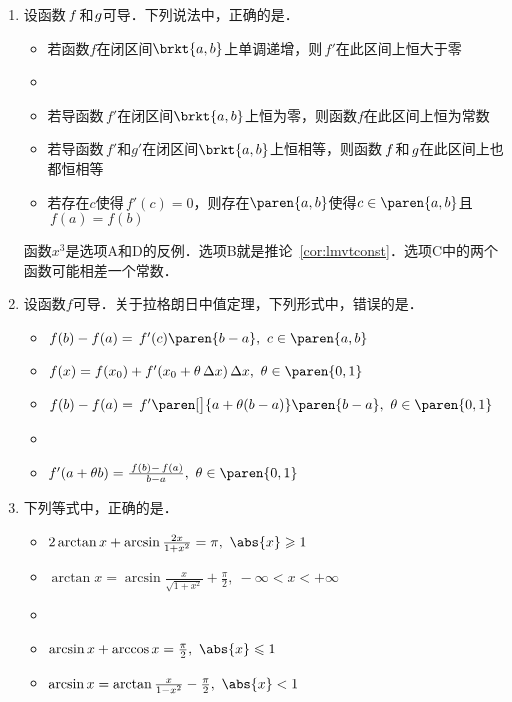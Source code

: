 \begin{enumerate}
\item 设函数\(\,f\mkern2mu\)和\(\mkern1mu g\)可导．下列说法中，正确的是\uline{\hspace{10em}}．
  \begin{itemize}
    \renewcommand{\labelitemi}{\faCircleThin}
  \item 若函数\(f\)在闭区间\(\brkt{a,b}\)上单调递增，则\(\,f'\!\)在此区间上恒大于零
    \ifshowsol
  \item[\faCircle]
    \else
  \item
    \fi
    若导函数\(\,f'\!\)在闭区间\(\brkt{a,b}\)上恒为零，则函数\(f\)在此区间上恒为常数
  \item 若导函数\(\,f'\!\)和\(g'\!\)在闭区间\(\brkt{a,b}\)上恒相等，则函数\(\,f\mkern2mu\)和\(\mkern2mu g\)在此区间上也都恒相等
  \item 若存在\(c\)使得\(\,f'(c) = 0\)，则存在\(\paren{a,b}\)使得\(c \in \paren{a,b}\)且\(\,f(a) = f(b)\)
  \end{itemize}

  \ifshowsol
  函数\(x^3\)是选项A和D的反例．选项B就是推论~\ref{cor:lmvtconst}．选项C中的两个函数可能相差一个常数．
  \fi

\item 设函数\(f\)可导．关于拉格朗日中值定理，下列形式中，错误的是\uline{\hspace{10em}}．
  \begin{itemize}
    \renewcommand{\labelitemi}{\faCircleThin}
  \item \(f(b) - f(a) = \,f'(c) \paren{b-a},\ c \in \paren{a,b}\)
  \item \(f(x) = f(x_0) + f'(x_0 + \theta\fdx) \fdx,\ \theta \in \paren{0,1}\)
  \item \(f(b) - f(a) = \,f'\paren[\big]{a + \theta(b-a)} \paren{b-a},\ \theta \in \paren{0,1}\)
    \ifshowsol
  \item[\faCircle]
    \else
  \item
    \fi
    \(f'(a + \theta b) = \frac{\,f(b)-\,f(a)}{b-a},\ \theta \in \paren{0,1}\)
  \end{itemize}

\item 下列等式中，正确的是\uline{\hspace{10em}}．
  \begin{itemize}
    \renewcommand{\labelitemi}{\faCircleThin}
  \item \(2\arctan x + \arcsin\frac{2x}{1+x^2} = \pi,\ \abs{x} \ge 1\)
  \item \(\arctan x = \arcsin\frac{x}{\sqrt{1+x^2}} + \frac\pi2,\ -\infty < x < +\infty\)
    \ifshowsol
  \item[\faCircle]
    \else
  \item
    \fi
    \(\arcsin x + \arccos x = \frac\pi2,\ \abs{x} \le 1\)
  \item \(\arcsin x = \arctan\frac{x}{1-x^2} - \frac\pi2,\ \abs{x} < 1\)
  \end{itemize}


\end{enumerate}
